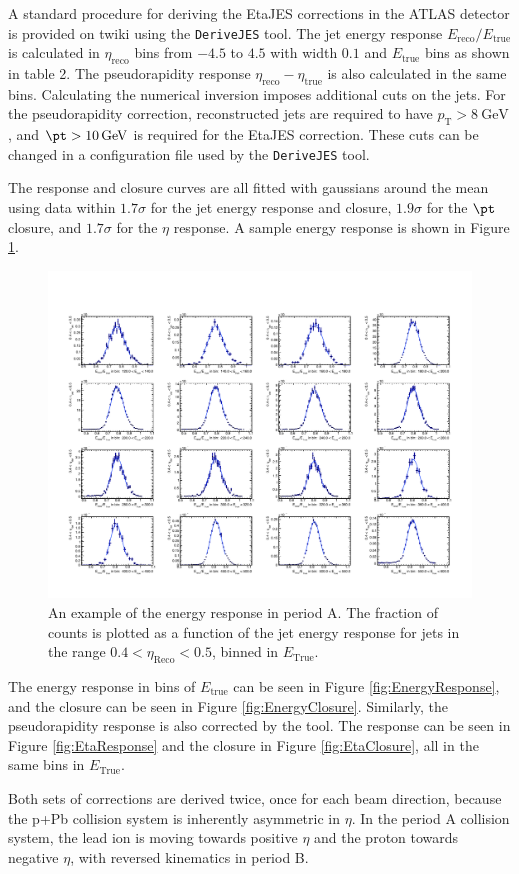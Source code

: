 \documentclass[NOTE, atlasdraft=true, texlive=2016, USenglish]{\ATLASLATEXPATH atlasdoc}
\begin{document}
A standard procedure for deriving the EtaJES corrections in the ATLAS detector is provided on twiki using the \texttt{DeriveJES} tool. The jet energy response $E_{\text{reco}}/E_{\text{true}}$ is calculated in $\eta_{\text{reco}}$ bins from $-4.5$ to $4.5$ with width $0.1$ and $E_{\text{true}}$ bins as shown in table 2. The pseudorapidity response $\eta_{\text{reco}}-\eta_{\text{true}}$ is also calculated in the same bins. Calculating the numerical inversion imposes additional cuts on the jets. For the pseudorapidity correction, reconstructed jets are required to have $p_{\text{T}} > \SI{8}{\GeV}$, and $\pt > \SI{10}{\GeV}$ is required for the EtaJES correction. These cuts can be changed in a configuration file used by the \texttt{DeriveJES} tool.\par
The response and closure curves are all fitted with gaussians around the mean using data within $1.7\sigma$ for the jet energy response and closure, $1.9\sigma$ for the $\pt$ closure, and $1.7\sigma$ for the $\eta$ response. A sample energy response is shown in Figure \ref{fig:SampleEnergyResponse}.
\begin{figure}[htbp]
	\centering
	\includegraphics[width=\textwidth]{figures/pPb_sampleEnergyResponse.pdf}
	\caption{An example of the energy response in period A. The fraction of counts is plotted as a function of the jet energy response for jets in the range $0.4<\eta_{\text{Reco}}<0.5$, binned in $E_{\text{True}}$.}
	\label{fig:SampleEnergyResponse}
\end{figure}\par
The energy response in bins of $E_{\text{true}}$ can be seen in Figure \ref{fig:EnergyResponse}, and the closure can be seen in Figure \ref{fig:EnergyClosure}. Similarly, the pseudorapidity response is also corrected by the tool. The response can be seen in Figure \ref{fig:EtaResponse} and the closure in Figure \ref{fig:EtaClosure}, all in the same bins in $E_{\text{True}}$.\par
Both sets of corrections are derived twice, once for each beam direction, because the p+Pb collision system is inherently asymmetric in $\eta$. In the period A collision system, the lead ion is moving towards positive $\eta$ and the proton towards negative $\eta$, with reversed kinematics in period B.
\end{document}
